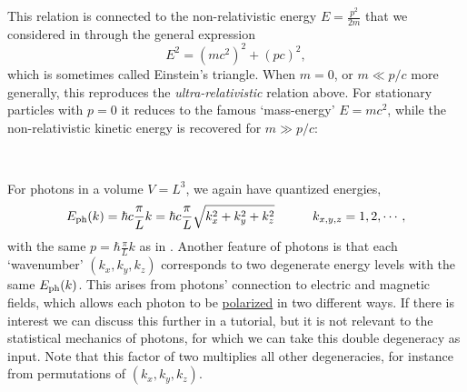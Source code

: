 This relation is connected to the non-relativistic energy $E = \frac{p^2}{2m}$ that we considered in  through the general expression
\begin{equation*}
  E^2 = \left(mc^2\right)^2 + \left(pc\right)^2,
\end{equation*}
which is sometimes called Einstein's triangle.
When $m = 0$, or $m \ll p / c$ more generally, this reproduces the \emph{ultra-relativistic} relation above.
For stationary particles with $p = 0$ it reduces to the famous `mass-energy' $E = mc^2$, while the non-relativistic kinetic energy is recovered for $m \gg p / c$: %
\begin{mdframed}
  \ \\[80 pt]
\end{mdframed}

For photons in a volume $V = L^3$, we again have quantized energies,
\begin{align}
  \label{eq:photon_Ek}
  E_{\text{ph}}(k) & = \hbar c \frac{\pi}{L} k = \hbar c \frac{\pi}{L} \sqrt{k_x^2 + k_y^2 + k_z^2} \qquad &
  k_{x, y, z} = 1, 2, \cdots,
\end{align}
with the same $p = \hbar \frac{\pi}{L} k$ as in .
Another feature of photons is that each `wavenumber' $(k_x, k_y, k_z)$ corresponds to two degenerate energy levels with the same $E_{\text{ph}}(k)$.
This arises from photons' connection to electric and magnetic fields, which allows each photon to be \href{https://en.wikipedia.org/wiki/Photon_polarization}{polarized} in two different ways.
If there is interest we can discuss this further in a tutorial, but it is not relevant to the statistical mechanics of photons, for which we can take this double degeneracy as input.
Note that this factor of two multiplies all other degeneracies, for instance from permutations of $(k_x, k_y, k_z)$.

